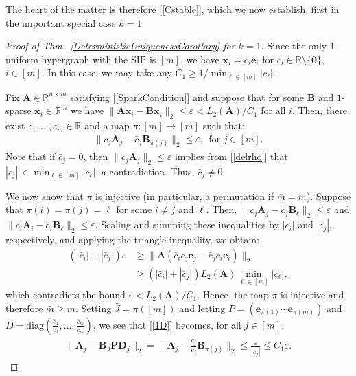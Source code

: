 \documentclass[9pt,twocolumn]{pnas-new}
\renewcommand{\eqref}[1]{\textnormal{[\ref{#1}]}}
\begin{document}
The heart of the matter is therefore \eqref{Cstable}, which we now establish, first in the important special case $k = 1$

\begin{proof}[Proof of Thm.~\ref{DeterministicUniquenessCorollary} for $k=1$]
Since the only 1-uniform hypergraph with the SIP is $[m]$, we have $\mathbf{x}_i = c_i \mathbf{e}_i$ for $c_i \in \mathbb{R} \setminus \{\mathbf{0}\}$, $i \in [m]$. In this case, we may take any $C_1 \geq 1/ \min_{\ell \in [m]} |c_{\ell}|$. 

Fix $\mathbf{A} \in \mathbb{R}^{n \times m}$ satisfying \eqref{SparkCondition} and suppose that for some $\mathbf{B}$ and $1$-sparse $\mathbf{\bar x}_i \in \mathbb{R}^{\bar m}$ we have  $\|\mathbf{A}\mathbf{x}_i - \mathbf{B}\mathbf{\bar x}_i\|_2 \leq \varepsilon < L_2(\mathbf{A}) / C_1$ for all $i$. Then, there exist $\bar{c}_1, \ldots, \bar{c}_m \in \mathbb{R}$ and a map $\pi: [m] \to [\bar m]$ such that:
\begin{align}\label{1D}
\|c_j\mathbf{A}_j - \bar{c}_j\mathbf{B}_{\pi(j)}\|_2 \leq \varepsilon,\ \ \text{for $j \in [m]$}.
\end{align} 
Note that if $\bar{c}_j = 0$, then $\|c_j\mathbf{A}_j \|_2 \leq \varepsilon$ implies from \eqref{delrho} that $|c_j| < \min_{\ell \in [m]} | c_\ell |$, a contradiction.  Thus, $\bar{c}_j \neq 0$.

We  now show that $\pi$ is injective (in particular, a permutation if $\bar m = m$). Suppose that $\pi(i) = \pi(j) = \ell$ for some $i \neq j$ and $\ell$. Then, $\|c_{j}\mathbf{A}_{j} - \bar{c}_{j}\mathbf{B}_{\ell}\|_2 \leq \varepsilon$ and $\|c_{i}\mathbf{A}_{i} - \bar{c}_{i} \mathbf{B}_{\ell}\|_2  \leq \varepsilon$. Scaling and summing these inequalities by $|\bar{c}_{i}|$ and $|\bar{c}_{j}|$, respectively, and applying the triangle inequality, we obtain:
\begin{align*}
(|\bar{c}_{i}| + |\bar{c}_{j}|) \varepsilon
&\geq\|\mathbf{A}(\bar{c}_{i}c_{j} \mathbf{e}_{j} - \bar{c}_{j}c_{i}\mathbf{e}_{i})\|_2 \nonumber \\ 
&\geq  \left( |\bar{c}_{i}| + |\bar{c}_{j}| \right) L_2(\mathbf{A}) \min_{\ell \in [m]} |c_\ell |,
\end{align*}
which contradicts the bound $\varepsilon < L_2(\mathbf{A})/C_1$. Hence, the map $\pi$ is injective and therefore $\bar m \geq m$. Setting $\bar J = \pi([m])$ and letting $P = \left( \mathbf{e}_{\pi(1)} \cdots \mathbf{e}_{\pi(m)}\right)$ and $D = \text{diag}(\frac{\bar{c}_1}{c_1},\ldots,\frac{\bar{c}_m}{c_m})$, we see that \eqref{1D} becomes, for all $j \in [m]$:
\begin{align*}
\|\mathbf{A}_j - \mathbf{B}_{\bar J}\mathbf{PD}_j\|_2 
= \|\mathbf{A}_j - \frac{\bar{c}_j}{c_j}\mathbf{B}_{\pi(j)}\|_2 
\leq \frac{\varepsilon}{|c_j|} 
\leq C_1\varepsilon.
\end{align*}
\vspace{-.2 cm}
\end{proof}
\end{document}
